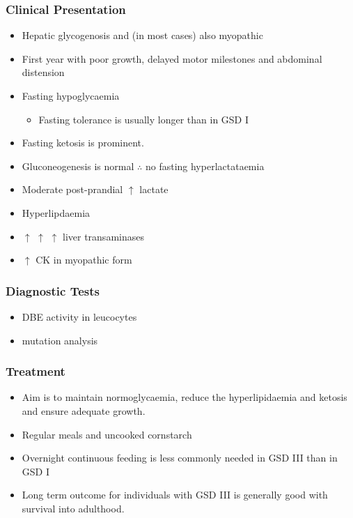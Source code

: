 \documentclass{scrartcl}
\begin{document}
\subsubsection{Clinical Presentation}
\label{sec:orge9c7b46}
\begin{itemize}
\item Hepatic glycogenosis and (in most cases) also myopathic
\item First year with poor growth, delayed motor milestones and abdominal
distension
\item Fasting hypoglycaemia 
\begin{itemize}
\item Fasting tolerance is usually longer than in GSD I
\end{itemize}
\item Fasting ketosis is prominent.
\item Gluconeogenesis is normal \(\therefore\) no fasting hyperlactataemia
\item Moderate post-prandial \(\uparrow\) lactate
\item Hyperlipdaemia
\item \(\uparrow\) \(\uparrow\) \(\uparrow\) liver transaminases
\item \(\uparrow\) CK in myopathic form
\end{itemize}
\subsubsection{Diagnostic Tests}
\label{sec:org54e97cc}
\begin{itemize}
\item DBE activity in leucocytes
\item mutation analysis
\end{itemize}
\subsubsection{Treatment}
\label{sec:org3186cce}
\begin{itemize}
\item Aim is to maintain normoglycaemia, reduce the hyperlipidaemia and ketosis and
ensure adequate growth.
\item Regular meals and uncooked cornstarch
\item Overnight continuous feeding is less commonly needed in GSD III than
in GSD I
\item Long term outcome for individuals with GSD III is generally good
with survival into adulthood.
\end{itemize}
\end{document}
